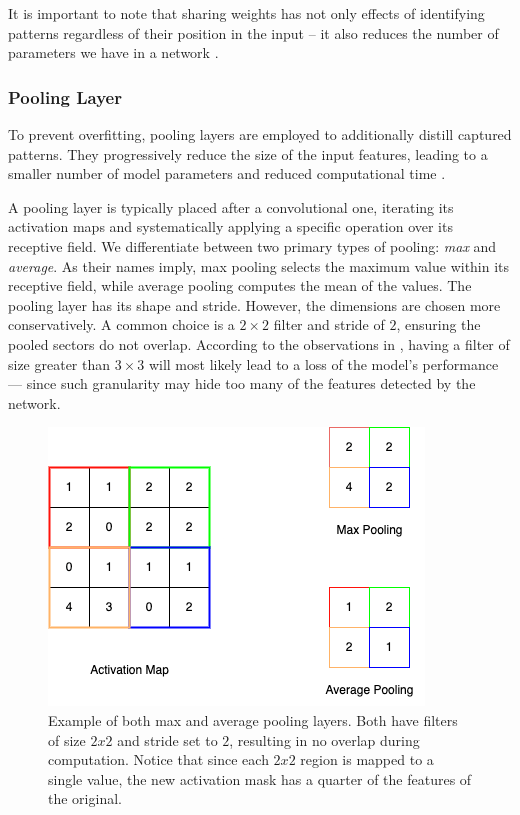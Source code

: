 It is important to note that sharing weights has not only effects of identifying patterns regardless of their position in the input -- it also reduces the number of parameters we have in a network \cite{cnns}.

\subsubsection{Pooling Layer}

To prevent overfitting, pooling layers are employed to additionally distill captured patterns.
They progressively reduce the size of the input features, leading to a smaller number of model parameters and reduced computational time \cite{cnns}.

A pooling layer is typically placed after a convolutional one, iterating its activation maps and systematically applying a specific operation over its receptive field.
We differentiate between two primary types of pooling: \emph{max} and \emph{average}.
As their names imply, max pooling selects the maximum value within its receptive field, while average pooling computes the mean of the values.
The pooling layer has its shape and stride.
However, the dimensions are chosen more conservatively.
A common choice is a $2 \times 2$ filter and stride of $2$, ensuring the pooled sectors do not overlap.
According to the observations in \cite{cnns}, having a filter of size greater than $3 \times 3$ will most likely lead to a loss of the model's performance --- since such granularity may hide too many of the features detected by the network.

\begin{figure}
    \begin{center}
    \begin{minipage}{0.5\textwidth}
      \includegraphics[width=\textwidth]{img/cnn-pool.png}
    \end{minipage}
    \caption{Example of both max and average pooling layers. Both have filters of size $2x2$ and stride set to $2$, resulting in no overlap during computation. Notice that since each $2x2$ region is mapped to a single value, the new activation mask has a quarter of the features of the original.}
    \label{fig:cnn-pooling}
    \end{center}
\end{figure}

